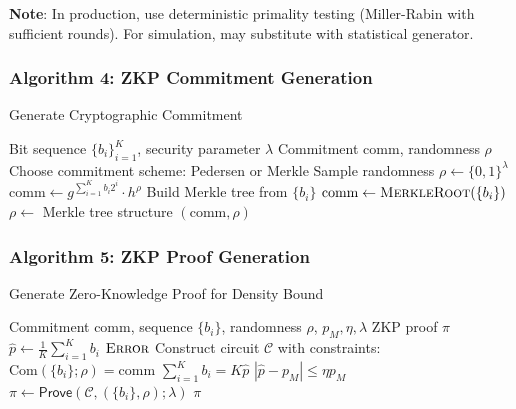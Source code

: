 \documentclass[12pt]{article}
\theoremstyle{plain}
\theoremstyle{definition}
\begin{document}
\textbf{Note}: In production, use deterministic primality testing (Miller-Rabin with sufficient rounds). For simulation, may substitute with statistical generator.

\subsubsection{Algorithm 4: ZKP Commitment Generation}

\begin{algorithm}
\caption{Generate Cryptographic Commitment}
\begin{algorithmic}[1]
\REQUIRE Bit sequence $\{b_i\}_{i=1}^K$, security parameter $\lambda$
\ENSURE Commitment $\text{comm}$, randomness $\rho$
\STATE Choose commitment scheme: Pedersen or Merkle
    \STATE Sample randomness $\rho \leftarrow \{0,1\}^{\lambda}$
    \STATE $\text{comm} \leftarrow g^{\sum_{i=1}^K b_i 2^i} \cdot h^{\rho}$ 
    \STATE Build Merkle tree from $\{b_i\}$
    \STATE $\text{comm} \leftarrow \textsc{MerkleRoot}(\{b_i\})$
    \STATE $\rho \leftarrow$ Merkle tree structure
\ENDIF
\RETURN $(\text{comm}, \rho)$
\end{algorithmic}
\end{algorithm}

\subsubsection{Algorithm 5: ZKP Proof Generation}

\begin{algorithm}
\caption{Generate Zero-Knowledge Proof for Density Bound}
\begin{algorithmic}[1]
\REQUIRE Commitment $\text{comm}$, sequence $\{b_i\}$, randomness $\rho$, $p_M, \eta, \lambda$
\ENSURE ZKP proof $\pi$
\STATE $\hat{p} \leftarrow \frac{1}{K}\sum_{i=1}^K b_i$ 
    \RETURN $\textsc{Error}$ 
\ENDIF
\STATE Construct circuit $\mathcal{C}$ with constraints:
\STATE \quad $\text{Com}(\{b_i\}; \rho) = \text{comm}$ 
\STATE \quad $\sum_{i=1}^K b_i = K\hat{p}$ 
\STATE \quad $|\hat{p} - p_M| \le \eta p_M$ 
\STATE $\pi \leftarrow \mathsf{Prove}(\mathcal{C}, (\{b_i\}, \rho); \lambda)$ 
\RETURN $\pi$
\end{algorithmic}
\end{algorithm}
\end{document}
